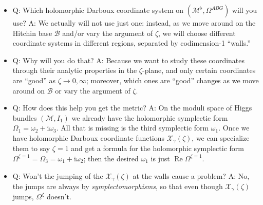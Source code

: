 \documentclass[12pt,letterpaper,reqno]{article}
\numberwithin{equation}{section}
\newcommand{\cB}{\ensuremath{\mathcal B}}
\newcommand{\cM}{\ensuremath{\mathcal M}}
\newcommand{\cX}{\ensuremath{\mathcal X}}
\newcommand{\I}{{\mathrm i}}
\newcommand{\ti}[1]{\textit{#1}}
\DeclareMathOperator{\re}{Re}
\newcommand{\insfig}[2]{

\medskip
\noindent
\begin{minipage}{\linewidth}

\makebox[\linewidth]{\texttt{[image: figures/\#1-crop.pdf]}}

\end{minipage}
\medskip

}
\begin{document}
\begin{itemize}
\item Q: Which holomorphic Darboux coordinate system on
$(\cM^\flat, \Omega^{ABG})$ will you use? A: We actually
will not use just one: instead, as we move around on the
Hitchin base $\cB$ and/or vary the argument of $\zeta$, 
we will choose different coordinate
systems in different regions, separated by codimension-1 ``walls.''

\insfig{higgs-metric-6}{0.8}

\item Q: Why will you do that? A: Because we want to study
these coordinates through their analytic properties in the
$\zeta$-plane, and only certain coordinates are ``good''
as $\zeta \to 0, \infty$; moreover, which ones are ``good'' changes as
we move around on $\cB$ or vary the argument of $\zeta$.


\item Q: How does this help you get the metric? A: On the
moduli space of Higgs bundles $(\cM, I_1)$ we 
already have the holomorphic
symplectic form $\Omega_1 = \omega_2 + \I \omega_3$. All that
is missing is the third symplectic form $\omega_1$.
Once we have holomorphic Darboux coordinate functions $\cX_\gamma(\zeta)$,
we can specialize them to say $\zeta = 1$ and get a formula
for the holomorphic symplectic form $\Omega^{\zeta = 1} = \Omega_3 = \omega_1 + \I \omega_2$; then the desired $\omega_1$ is just
$\re \Omega^{\zeta = 1}$.

\item Q: Won't the jumping of the $\cX_\gamma(\zeta)$ at the walls
cause a problem? A: No, the jumps are always by \ti{symplectomorphisms},
so that even though $\cX_\gamma(\zeta)$ jumps, $\Omega^\zeta$ doesn't.
\end{itemize}
\end{document}
